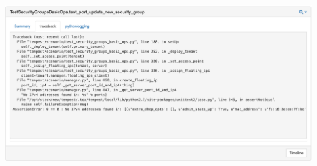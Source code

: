 \documentclass[aspectratio=43,11pt,hyperref={colorlinks=true}]{beamer}
\begin{document}
\begin{frame}
  \begin{center}
    \includegraphics[width=1.0\textheight]{stackviz-sample-traceback.png}
  \end{center}
\end{frame}
\end{document}
